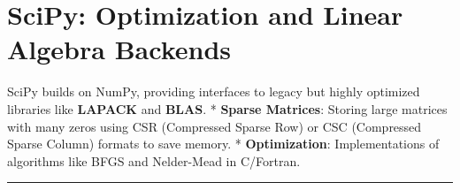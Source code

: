 \hypertarget{scipy-optimization-and-linear-algebra-backends}{%
\chapter{SciPy: Optimization and Linear Algebra
Backends}\label{scipy-optimization-and-linear-algebra-backends}}

SciPy builds on NumPy, providing interfaces to legacy but highly
optimized libraries like \textbf{LAPACK} and \textbf{BLAS}. *
\textbf{Sparse Matrices}: Storing large matrices with many zeros using
CSR (Compressed Sparse Row) or CSC (Compressed Sparse Column) formats to
save memory. * \textbf{Optimization}: Implementations of algorithms like
BFGS and Nelder-Mead in C/Fortran.

\begin{center}\rule{0.5\linewidth}{0.5pt}\end{center}
